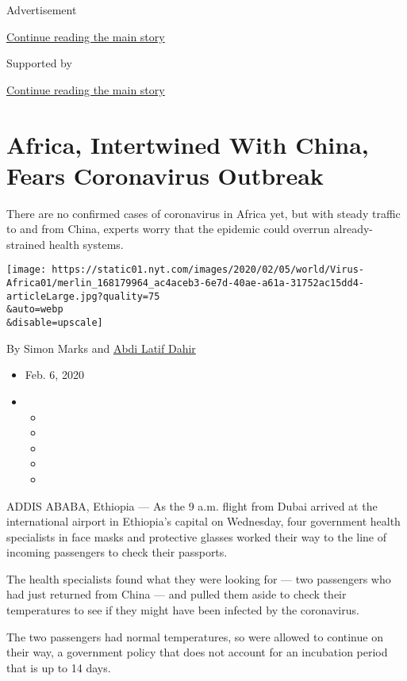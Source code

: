Advertisement

\protect\hyperlink{after-top}{Continue reading the main story}

Supported by

\protect\hyperlink{after-sponsor}{Continue reading the main story}

\hypertarget{africa-intertwined-with-china-fears-coronavirus-outbreak}{%
\section{Africa, Intertwined With China, Fears Coronavirus
Outbreak}\label{africa-intertwined-with-china-fears-coronavirus-outbreak}}

There are no confirmed cases of coronavirus in Africa yet, but with
steady traffic to and from China, experts worry that the epidemic could
overrun already-strained health systems.

\texttt{[image: https://static01.nyt.com/images/2020/02/05/world/Virus-Africa01/merlin\_168179964\_ac4aceb3-6e7d-40ae-a61a-31752ac15dd4-articleLarge.jpg?quality=75\\\&auto=webp\\\&disable=upscale]}

By Simon Marks and
\href{https://www.nytimes.com/by/abdi-latif-dahir}{Abdi Latif Dahir}

\begin{itemize}
\item
  Feb. 6, 2020
\item
  \begin{itemize}
  \item
  \item
  \item
  \item
  \item
  \end{itemize}
\end{itemize}

ADDIS ABABA, Ethiopia --- As the 9 a.m. flight from Dubai arrived at the
international airport in Ethiopia's capital on Wednesday, four
government health specialists in face masks and protective glasses
worked their way to the line of incoming passengers to check their
passports.

The health specialists found what they were looking for --- two
passengers who had just returned from China --- and pulled them aside to
check their temperatures to see if they might have been infected by the
coronavirus.

The two passengers had normal temperatures, so were allowed to continue
on their way, a government policy that does not account for an
incubation period that is up to 14 days.


